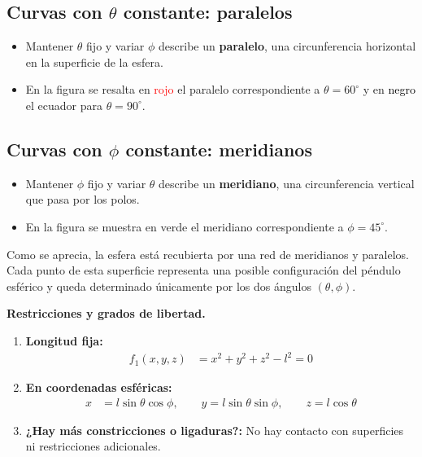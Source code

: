 \documentclass{article}
\begin{document}
\subsection*{Curvas con $\theta$ constante: paralelos}
\begin{itemize}
    \item Mantener $\theta$ fijo y variar $\phi$ describe un \textbf{paralelo}, una circunferencia horizontal en la superficie de la esfera.
    \item En la figura se resalta en \textcolor{red}{rojo} el paralelo correspondiente a $\theta=60^\circ$ y en \textcolor{black}{negro} el ecuador para $\theta=90^\circ$.
\end{itemize}

\subsection*{Curvas con $\phi$ constante: meridianos}
\begin{itemize}
    \item Mantener $\phi$ fijo y variar $\theta$ describe un \textbf{meridiano}, una circunferencia vertical que pasa por los polos.
    \item En la figura se muestra en \textcolor{green!70!black}{verde} el meridiano correspondiente a $\phi=45^\circ$.
\end{itemize}

Como se aprecia, la esfera está recubierta por una red de meridianos y paralelos.  
Cada punto de esta superficie representa una posible configuración del péndulo esférico y queda determinado únicamente por los dos ángulos $(\theta,\phi)$.



\vspace{0.4cm}
\noindent\textbf{Restricciones y grados de libertad.}
\begin{enumerate}
  \item \textbf{Longitud fija:}
  \begin{equation}
  \begin{split}
  f_1(x,y,z) &= x^{2}+y^{2}+z^{2}-l^{2} = 0 
  \end{split}\label{eq:constraint-longitud}
  \end{equation}

  \item \textbf{En coordenadas esféricas:}
  \begin{equation}
  \begin{split}
  x&=l\sin\theta\cos\phi,\qquad
  y=l\sin\theta\sin\phi,\qquad
  z=l\cos\theta
  \end{split}\label{eq:coordenadas-esfericas-fijas}
  \end{equation}

  \item \textbf{¿Hay más constricciones o ligaduras?:}  
        No hay contacto con superficies ni restricciones adicionales.
\end{enumerate}
\end{document}
